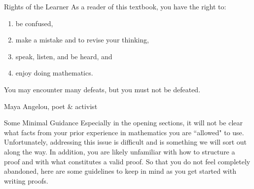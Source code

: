 \begin{section}{Rights of the Learner}\label{sec:Rights of the Learner}
As a reader of this textbook, you have the right to:
\begin{enumerate}
\item be confused,
\item make a mistake and to revise your thinking,
\item speak, listen, and be heard, and
\item enjoy doing mathematics.
\end{enumerate}

\epigraph{You may encounter many defeats, but you must not be defeated.}{Maya Angelou, poet \& activist}

\end{section}

\begin{section}{Some Minimal Guidance}\label{sec:guidance}
Especially in the opening sections, it will not be clear what facts from your prior experience in mathematics you are ``allowed" to use.  Unfortunately, addressing this issue is difficult and is something we will sort out along the way.  In addition, you are likely unfamiliar with how to structure a proof and with what constitutes a valid proof.  So that you do not feel completely abandoned, here are some guidelines to keep in mind as you get started with writing proofs.


\end{section}
